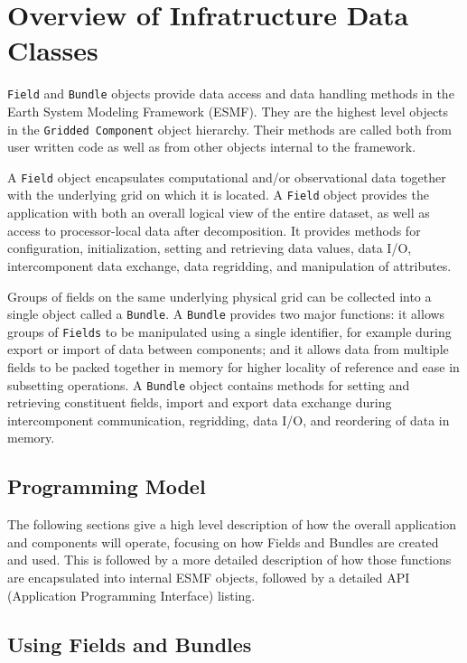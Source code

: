 
\section{Overview of Infratructure Data Classes}

{\tt Field} and {\tt Bundle} objects provide 
data access and data handling methods
in the Earth System Modeling Framework (ESMF).
They are the highest level objects in the
{\tt Gridded Component} object hierarchy.
Their methods are called both from user written
code as well as from other objects internal to the framework.

A {\tt Field} 
object encapsulates computational and/or observational data together 
with the underlying grid on which it is located.  
A {\tt Field} object provides the
application with both an overall logical view of the entire
dataset, as well as access to processor-local data after decomposition.
It provides methods for configuration, initialization, setting and
retrieving data values, data I/O, intercomponent data 
exchange, data regridding, and manipulation of attributes.

Groups of fields on the same underlying physical grid 
can be collected into a single
object called a {\tt Bundle}.  
A {\tt Bundle} provides two major functions: it allows groups of 
{\tt Fields}
to be manipulated using a single identifier, for example during
export or import of data between components; and it allows
data from multiple fields to be packed together in memory 
for higher locality of reference and ease in subsetting operations.
A {\tt Bundle} object contains methods
for setting and retrieving constituent fields, import and export
data exchange during intercomponent communication,
regridding, data I/O, and reordering of data in memory.


\subsection{Programming Model}

The following sections give a high level description of how
the overall application and components will operate,
focusing on how Fields and Bundles are created and used.
This is followed by a more detailed description of how
those functions are encapsulated into internal ESMF 
objects, followed by a detailed API (Application Programming
Interface) listing.

\subsection{Using Fields and Bundles}

